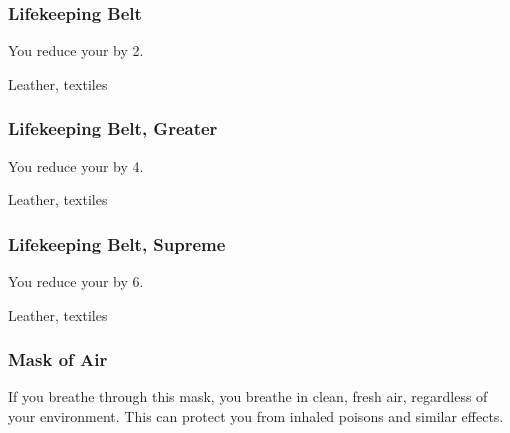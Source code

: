 \lowercase{\hypertarget{item:Lifekeeping Belt}{}}\label{item:Lifekeeping Belt}
\hypertarget{item:Lifekeeping Belt}{\subsubsection{Lifekeeping Belt\hfill{}}}

You reduce your  by 2.



 


 Leather, textiles


\lowercase{\hypertarget{item:Lifekeeping Belt, Greater}{}}\label{item:Lifekeeping Belt, Greater}
\hypertarget{item:Lifekeeping Belt, Greater}{\subsubsection{Lifekeeping Belt, Greater\hfill{}}}

You reduce your  by 4.



 


 Leather, textiles


\lowercase{\hypertarget{item:Lifekeeping Belt, Supreme}{}}\label{item:Lifekeeping Belt, Supreme}
\hypertarget{item:Lifekeeping Belt, Supreme}{\subsubsection{Lifekeeping Belt, Supreme\hfill{}}}

You reduce your  by 6.



 


 Leather, textiles


\lowercase{\hypertarget{item:Mask of Air}{}}\label{item:Mask of Air}
\hypertarget{item:Mask of Air}{\subsubsection{Mask of Air\hfill{}}}

If you breathe through this mask, you breathe in clean, fresh air, regardless of your environment.
This can protect you from inhaled poisons and similar effects.



